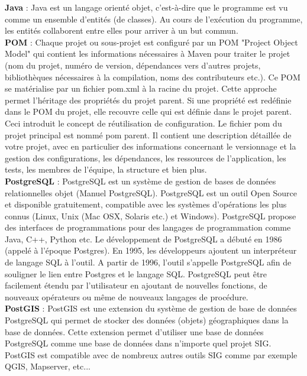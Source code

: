 \textbf{Java} : Java est un langage orienté objet, c'est-à-dire que le programme est vu comme un ensemble d'entités (de classes). Au cours de l'exécution du programme, les entités collaborent entre elles pour arriver à un but commun.\\

\textbf{POM} : Chaque projet ou sous-projet est configuré par un POM "Project Object Model" qui contient les informations nécessaires à Maven pour traiter le projet (nom du projet, numéro de version, dépendances vers d'autres projets, bibliothèques nécessaires à la compilation, noms des contributeurs etc.). Ce POM se matérialise par un fichier pom.xml à la racine du projet. Cette approche permet l'héritage des propriétés du projet parent. Si une propriété est redéfinie dans le POM du projet, elle recouvre celle qui est définie dans le projet parent. Ceci introduit le concept de réutilisation de configuration. Le fichier pom du projet principal est nommé pom parent. Il contient une description détaillée de votre projet, avec en particulier des informations concernant le versionnage et la gestion des configurations, les dépendances, les ressources de l'application, les tests, les membres de l'équipe, la structure et bien plus.\\

\textbf{PostgreSQL} : PostgreSQL est un système de gestion de bases de données relationnelles objet (Manuel PostgreSQL). PostgreSQL est un outil Open Source et disponible gratuitement, compatible avec les systèmes d'opérations les plus connus (Linux, Unix (Mac OSX, Solaris etc.) et Windows). PostgreSQL propose des interfaces de programmations pour des langages de programmation comme Java, C++, Python etc.
Le développement de PostgreSQL a débuté en 1986 (appelé à l'époque Postgres). En 1995, les développeurs ajoutent un interpréteur de langage SQL à l'outil. A partir de 1996, l'outil s'appelle PostgreSQL afin de souligner le lien entre Postgres et le langage SQL. PostgreSQL peut être facilement étendu par l'utilisateur en ajoutant de nouvelles fonctions, de nouveaux opérateurs ou même de nouveaux langages de procédure.\\

\textbf{PostGIS} : PostGIS est une extension du système de gestion de base de données PostgreSQL qui permet de stocker des données (objets) géographiques dans la base de données. Cette extension permet d'utiliser une base de données PostgreSQL comme une base de données dans n'importe quel projet SIG. PostGIS est compatible avec de nombreux autres outils SIG comme par exemple QGIS, Mapserver, etc...\\

